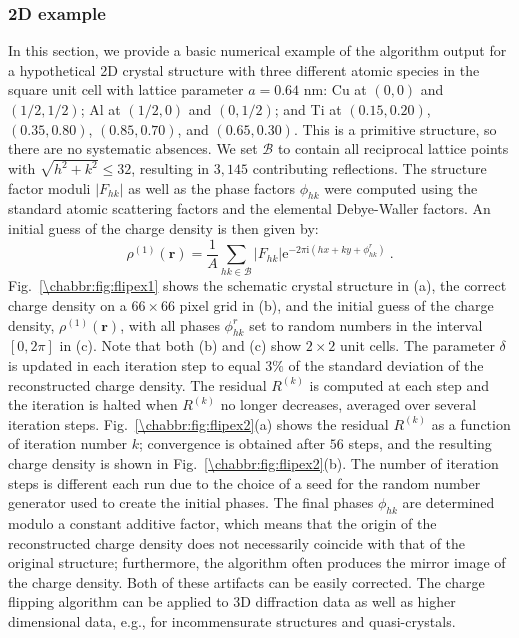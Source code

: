 \subsubsection{2D example}
In this section, we provide a basic numerical example of the algorithm output for a hypothetical 2D crystal structure with three different atomic species in the square unit cell with lattice parameter $a=0.64$ nm: Cu at $(0,0)$ and $(1/2,1/2)$; Al at $(1/2,0)$ and $(0,1/2)$; and Ti at $(0.15,0.20)$, $(0.35,0.80)$, $(0.85,0.70)$, and $(0.65,0.30)$.  This is a primitive structure, so there are no systematic absences. We set $\mathcal{B}$ to contain all reciprocal lattice points with $\sqrt{h^2+k^2}\le 32$, resulting in $3,145$ contributing reflections.  The structure factor moduli $\vert F_{hk}\vert$ as well as the phase factors $\phi_{hk}$ were computed using the standard atomic scattering factors and the elemental Debye-Waller factors.  An initial guess of the charge density is then given by:
\[
	\rho^{(1)}(\mathbf{r})=\frac{1}{A}\sum_{hk\in\mathcal{B}}\vert F_{hk}\vert\mathrm{e}^{-2\pi\mathrm{i}(hx+ky+\phi_{hk}^r)}\ .
\]
Fig.~\ref{\chabbr:fig:flipex1} shows the schematic crystal structure in (a), the correct charge density on a $66\times 66$ pixel grid in (b), and the initial guess of the charge density, $\rho^{(1)}(\mathbf{r})$, with all phases $\phi_{hk}^r$ set to random numbers in the interval $[0,2\pi]$ in (c). Note that both (b) and (c) show $2\times 2$ unit cells.  The parameter $\delta$ is updated in each iteration step to equal $3\%$ of the standard deviation of the reconstructed charge density. The residual $R^{(k)}$ is computed at each step and the iteration is halted when $R^{(k)}$ no longer decreases, averaged over several iteration steps.  Fig.~\ref{\chabbr:fig:flipex2}(a) shows the residual $R^{(k)}$ as a function of iteration number $k$; convergence is obtained after $56$ steps, and the resulting charge density is shown in Fig.~\ref{\chabbr:fig:flipex2}(b). The number of iteration steps is different each run due to the choice of a seed for the random number generator used to create the initial phases. The final phases $\phi_{hk}$ are determined modulo a constant additive factor, which means that the origin of the reconstructed charge density does not necessarily coincide with that of the original structure; furthermore, the algorithm often produces the mirror image of the charge density. Both of these artifacts can be easily corrected.  The charge flipping algorithm can be applied to 3D diffraction data as well as higher dimensional data, e.g., for incommensurate structures and quasi-crystals.  


